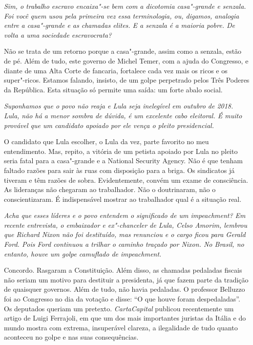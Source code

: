 \itshape
 Sim, o trabalho escravo encaixa"-se bem com a dicotomia
casa"-grande e senzala. Foi você quem usou pela primeira vez essa
terminologia, ou, digamos, analogia entre a casa"-grande e as chamadas
elites. E a senzala é a maioria pobre. De volta a uma sociedade
escravocrata?

\normalfont
Não se trata de um retorno porque a casa"-grande, assim
como a senzala, estão de pé. Além de tudo, este governo de Michel Temer,
com a ajuda do Congresso, e diante de uma Alta Corte de fancaria,
fortalece cada vez mais os ricos e os super"-ricos. Estamos falando,
insisto, de um golpe perpetrado pelos Três Poderes da República. Esta
situação só permite uma saída: um forte abalo social.

\itshape
 Suponhamos que o povo não reaja e Lula seja inelegível
em outubro de 2018. Lula, não há a menor sombra de dúvida, é um
excelente cabo eleitoral. É muito provável que um candidato apoiado por
ele vença o pleito presidencial.

\normalfont
O candidato que Lula escolher, o Lula da vez, parte
favorito no meu entendimento. Mas, repito, a vitória de um petista
apoiado por Lula no pleito seria fatal para a casa"-grande e a National
Security Agency. Não é que tenham faltado razões para sair às ruas com
disposição para a briga. Os sindicatos já tiveram e têm razões de sobra.
Evidentemente, convém um exame de consciência. As lideranças não
chegaram ao trabalhador. Não o doutrinaram, não o conscientizaram. É
indispensável mostrar ao trabalhador qual é a situação real.

\itshape
 Acha que esses líderes e o povo entendem o significado
de um \emph{impeachment}? Em recente entrevista, o embaixador e
ex"-chanceler de Lula, Celso Amorim, lembrou que Richard Nixon não foi
destituído, mas renunciou e o cargo ficou para Gerald Ford. Pois Ford
continuou a trilhar o caminho traçado por Nixon. No Brasil, no entanto,
houve um golpe camuflado de \emph{impeachment}.

\normalfont
Concordo. Rasgaram a Constituição. Além disso, as
chamadas pedaladas fiscais não seriam um motivo para destituir a
presidenta, já que fazem parte da tradição de quaisquer governos. Além
de tudo, não havia pedaladas. O professor Belluzzo foi ao Congresso no
dia da votação e disse: ``O que houve foram despedaladas''. Os deputados
queriam um pretexto. \emph{CartaCapital} publicou recentemente um artigo
de Luigi Ferrajoli, em que um dos mais importantes juristas da Itália e
do mundo mostra com extrema, insuperável clareza, a ilegalidade de tudo
quanto aconteceu no golpe e nas suas consequências.

